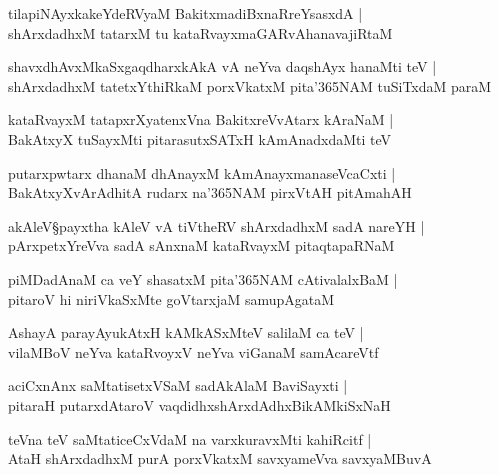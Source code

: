 \begin{shloka}
tilapiNAyxkakeYdeRVyaM BakitxmadiBxnaRreYsasxdA |\\
shArxdadhxM tatarxM tu kataRvayxmaGARvAhanavajiRtaM 
\end{shloka}

\begin{shloka}
shavxdhAvxMkaSxgaqdharxkAkA vA neYva daqshAyx hanaMti teV |\\
shArxdadhxM tatetxYthiRkaM porxVkatxM pita\char'365NAM tuSiTxdaM paraM 
\end{shloka}

\begin{shloka}
kataRvayxM tatapxrXyatenxVna BakitxreVvAtarx kAraNaM |\\
BakAtxyX tuSayxMti pitarasutxSATxH kAmAnadxdaMti teV 
\end{shloka}

\begin{shloka}
putarxpwtarx dhanaM dhAnayxM kAmAnayx\R manaseVcaCxti |\\
BakAtxyXvArAdhitA rudarx na\char'365NAM pirxVtAH pitAmahAH 
\end{shloka}

\begin{shloka}
akAleV\S payxtha kAleV vA tiVtheRV shArxdadhxM sadA nareYH |\\
pArxpetxYreVva sadA sAnxnaM kataRvayxM pitaqtapaRNaM 
\end{shloka}

\begin{shloka}
piMDadAnaM ca veY shasatxM pita\char'365NAM cAtivalalxBaM |\\
pitaroV hi niriVkaSxMte goVtarxjaM samupAgataM 
\end{shloka}

\begin{shloka}
AshayA parayAyukAtxH kAMkASxMteV salilaM ca teV |\\
vilaMBoV neYva kataRvoyxV neYva viGanaM samAcareVtf 
\end{shloka}

\begin{shloka}
aciCxnAnx saMtatisetxVSaM sadAkAlaM BaviSayxti |\\
pitaraH putarxdAtaroV vaqdidhxshArxdAdhxBikAMkiSxNaH 
\end{shloka}

\begin{shloka}
teVna teV saMtaticeCxVdaM na varxkuravxMti kahiRcitf |\\
AtaH shArxdadhxM purA porxVkatxM savxyameVva savxyaMBuvA 
\end{shloka}

